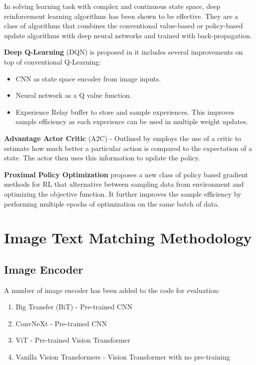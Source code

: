 \documentclass[conference]{IEEEtran}
\begin{document}
In solving learning task with complex and continuous state space, deep reinforcement learning algorithms has been shown to be effective. They are a class of algorithms that combines the conventional value-based or policy-based update algorithms with deep neural networks and trained with back-propagation.

\textbf{Deep Q-Learning} (DQN) is proposed in \cite{mnihPlayingAtariDeep2013} it includes several improvements on top of conventional Q-Learning:

\begin{itemize}
    \item CNN as state space encoder from image inputs.
    \item Neural network as a Q value function.
    \item Experience Relay buffer to store and sample experiences. This improves sample efficiency as each experience can be used in multiple weight updates.
\end{itemize}

\textbf{Advantage Actor Critic} (A2C) - Outlined by \cite{plaatDeepReinforcementLearning2022} employs the use of a critic to estimate how much better a particular action is compared to the expectation of a state. The actor then uses this information to update the policy.

\textbf{Proximal Policy Optimization} \cite{schulmanProximalPolicyOptimization2017} proposes a new class of policy based gradient methods for RL that alternative between sampling data from environment and optimizing the objective function. It further improves the sample efficiency by performing multiple epochs of optimization on the same batch of data.

\section{Image Text Matching Methodology}

\subsection{Image Encoder}

A number of image encoder has been added to the code for evaluation:

\begin{enumerate}
    \item Big Transfer (BiT) - Pre-trained CNN
    \item ConvNeXt - Pre-trained CNN
    \item ViT - Pre-trained Vision Transformer
    \item Vanilla Vision Transformers - Vision Transformer with no pre-training
\end{enumerate}
\end{document}

